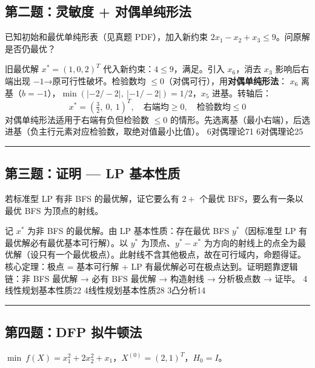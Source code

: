\subsection*{第二题：灵敏度 + 对偶单纯形法}

\noindent 已知初始和最优单纯形表（见真题 PDF），加入新约束 $2x_1 - x_2 + x_3 \le 9$。问原解是否仍最优？

  {旧最优解 $x^*=(1,0,2)^T$ 代入新约束：$4\le 9$，满足。引入 $x_6$，消去 $x_3$ 影响后右端出现 $-1$→原可行性破坏。检验数均 $\le 0$（对偶可行），用\textbf{对偶单纯形法}：
  $x_6$ 离基（$b=-1$），$\min(|-2/-2|,\ |-1/-2|)=1/2$，$x_5$ 进基。转轴后：
  \[
  x^* = (\tfrac{3}{2},\ 0,\ 1)^T,\quad \text{右端均}\ge 0,\quad \text{检验数均}\le 0
  \]}
  {对偶单纯形法适用于右端有负但检验数 $\le 0$ 的情形。先选离基（最小右端），后选进基（负主行元素对应检验数，取绝对值最小比值）。}
  {6对偶理论}{71}
  {6对偶理论}{25}

\rule{\textwidth}{0.4pt}

\subsection*{第三题：证明 — LP 基本性质}

\noindent 若标准型 LP 有非 BFS 的最优解，证它要么有 $2+$ 个最优 BFS，要么有一条以最优 BFS 为顶点的射线。

  {记 $x^*$ 为非 BFS 的最优解。由 LP 基本性质：存在最优 BFS $y^*$（因标准型 LP 有最优解必有最优基本可行解）。以 $y^*$ 为顶点、$y^*-x^*$ 为方向的射线上的点全为最优解（设只有一个最优极点）。此射线不含其他极点，故在可行域内，命题得证。}
  {核心定理：极点 = 基本可行解 + LP 有最优解必可在极点达到。证明题靠逻辑链：非 BFS 最优解 → 必有 BFS 最优解 → 构造射线 → 分析极点数 → 证毕。}
  {4线性规划基本性质}{22}
  {4线性规划基本性质}{28}
  {3凸分析}{14}

\rule{\textwidth}{0.4pt}

\subsection*{第四题：DFP 拟牛顿法}

\noindent $\min\ f(X) = x_1^2 + 2x_2^2 + x_1$，$X^{(0)}=(2,1)^T$，$H_0=I$。

